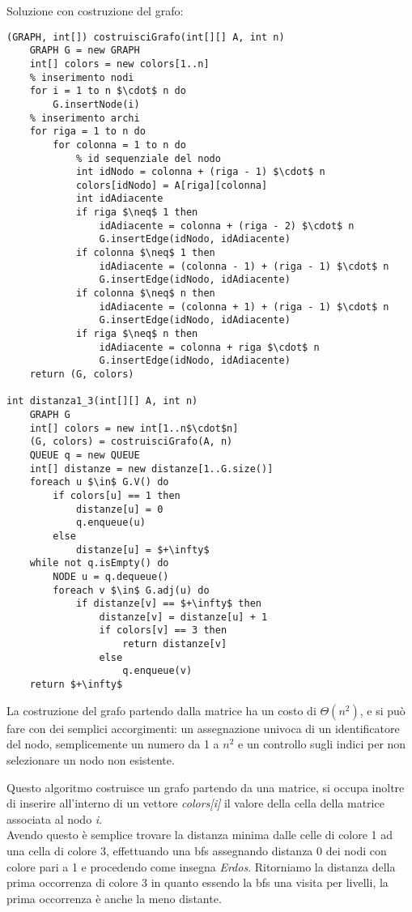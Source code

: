 \documentclass[../cheatSheetAlgoritmi.tex]{subfiles}
\begin{document}
Soluzione con costruzione del grafo:
\begin{lstlisting}[caption=Griglia quadra - costruzione grafo]
(GRAPH, int[]) costruisciGrafo(int[][] A, int n)
	GRAPH G = new GRAPH
  	int[] colors = new colors[1..n]
  	% inserimento nodi
  	for i = 1 to n $\cdot$ n do
    	G.insertNode(i)
  	% inserimento archi
  	for riga = 1 to n do
    	for colonna = 1 to n do
      		% id sequenziale del nodo
      		int idNodo = colonna + (riga - 1) $\cdot$ n
      		colors[idNodo] = A[riga][colonna]
      		int idAdiacente
      		if riga $\neq$ 1 then 
        		idAdiacente = colonna + (riga - 2) $\cdot$ n
        		G.insertEdge(idNodo, idAdiacente)
      		if colonna $\neq$ 1 then
        		idAdiacente = (colonna - 1) + (riga - 1) $\cdot$ n
        		G.insertEdge(idNodo, idAdiacente)
      		if colonna $\neq$ n then
        		idAdiacente = (colonna + 1) + (riga - 1) $\cdot$ n
        		G.insertEdge(idNodo, idAdiacente)
      		if riga $\neq$ n then
        		idAdiacente = colonna + riga $\cdot$ n
        		G.insertEdge(idNodo, idAdiacente)
  	return (G, colors)

int distanza1_3(int[][] A, int n)
	GRAPH G
  	int[] colors = new int[1..n$\cdot$n]
  	(G, colors) = costruisciGrafo(A, n)
  	QUEUE q = new QUEUE
  	int[] distanze = new distanze[1..G.size()]
  	foreach u $\in$ G.V() do
    	if colors[u] == 1 then
      		distanze[u] = 0
      		q.enqueue(u)
    	else
      		distanze[u] = $+\infty$
  	while not q.isEmpty() do
    	NODE u = q.dequeue()
    	foreach v $\in$ G.adj(u) do
      		if distanze[v] == $+\infty$ then
        		distanze[v] = distanze[u] + 1
        		if colors[v] == 3 then 
          			return distanze[v]
        		else
          			q.enqueue(v)
  	return $+\infty$
\end{lstlisting}
La costruzione del grafo partendo dalla matrice ha un costo di $\Theta(n^2)$, e si può fare con dei semplici accorgimenti: un assegnazione univoca di un identificatore del nodo, semplicemente un numero da 1 a $n^2$ e un controllo sugli indici per non selezionare un nodo non esistente. 

Questo algoritmo costruisce un grafo partendo da una matrice, si occupa inoltre di inserire all'interno di un vettore \textit{colors[i]} il valore della cella della matrice associata al nodo \textit{i}. \\ Avendo questo è semplice trovare la distanza minima dalle celle di colore 1 ad una cella di colore 3, effettuando una bfs assegnando distanza 0 dei nodi con colore pari a 1 e procedendo come insegna \textit{Erdos}. Ritorniamo la distanza della prima occorrenza di colore 3 in quanto essendo la bfs una visita per livelli, la prima occorrenza è anche la meno distante.
\end{document}
